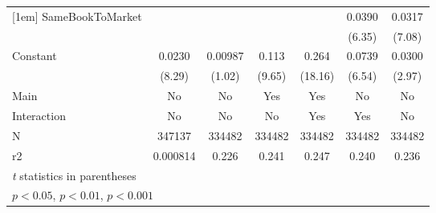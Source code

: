 {\begin{tabular}{l*{6}{c}}
[1em]
SameBookToMarket    &                     &                     &                     &                     &      0.0390\sym{***}&      0.0317\sym{***}\\
                    &                     &                     &                     &                     &      (6.35)         &      (7.08)         \\
[1em]
Constant            &      0.0230\sym{***}&     0.00987         &       0.113\sym{***}&       0.264\sym{***}&      0.0739\sym{***}&      0.0300\sym{**} \\
                    &      (8.29)         &      (1.02)         &      (9.65)         &     (18.16)         &      (6.54)         &      (2.97)         \\
\hline
Main                &          No         &          No         &         Yes         &         Yes         &          No         &          No         \\
Interaction         &          No         &          No         &          No         &         Yes         &         Yes         &          No         \\
N                   &      347137         &      334482         &      334482         &      334482         &      334482         &      334482         \\
r2                  &    0.000814         &       0.226         &       0.241         &       0.247         &       0.240         &       0.236         \\
\hline\hline
\multicolumn{7}{l}{\footnotesize \textit{t} statistics in parentheses}\\
\multicolumn{7}{l}{\footnotesize \sym{*} \(p<0.05\), \sym{**} \(p<0.01\), \sym{***} \(p<0.001\)}\\
\end{tabular}
}
